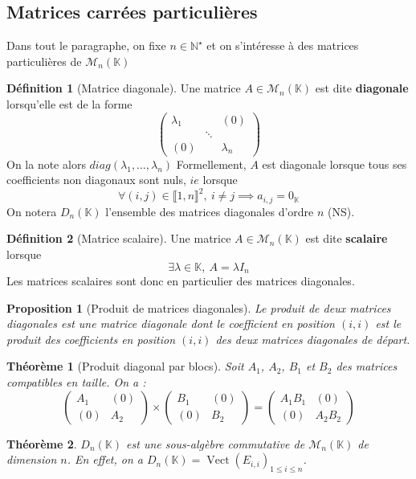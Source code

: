 \documentclass[french]{book}
\newcommand{\N}{\mathbb{N}}
\newcommand{\K}{\mathbb{K}}
\newcommand{\st}{^\star}
\theoremstyle{plain}
\newtheorem{thm}{Théorème}[chapter]
\newtheorem{prop}{Proposition}[chapter]
\theoremstyle{definition}
\newtheorem{dfn}{Définition}[chapter]
\theoremstyle{remark}
\DeclareMathOperator{\vect}{Vect}
\begin{document}
\subsection{Matrices carrées particulières}
Dans tout le paragraphe, on fixe $n\in\N\st$ et on s'intéresse à des matrices particulières de $\mathcal{M}_n(\K)$
\begin{dfn}[Matrice diagonale]
	Une matrice $A\in\mathcal{M}_n(\K)$ est dite \textbf{diagonale} lorsqu'elle est de la forme $$\begin{pmatrix}\lambda_1&&(0)\\&\ddots&\\ (0)&&\lambda_n\end{pmatrix}$$ On la note alors $diag(\lambda_1,\ldots,\lambda_n)$ Formellement, $A$ est diagonale lorsque tous ses coefficients non diagonaux sont nuls, $ie$ lorsque $$\forall(i,j)\in\llbracket1,n\rrbracket^2,\ i\ne j\implies a_{i,j}=0_\K$$ On notera $D_n(\K)$ l'ensemble des matrices diagonales d'ordre $n$ (NS).
\end{dfn}
\begin{dfn}[Matrice scalaire]
	Une matrice $A\in\mathcal{M}_n(\K)$ est dite \textbf{scalaire} lorsque $$\exists\lambda\in\K,\ A=\lambda I_n$$ Les matrices scalaires sont donc en particulier des matrices diagonales.
\end{dfn}
\begin{prop}[Produit de matrices diagonales]
	Le produit de deux matrices diagonales est une matrice diagonale dont le coefficient en position $(i,i)$ est le produit des coefficients en position $(i,i)$ des deux matrices diagonales de départ.
\end{prop}
\begin{thm}[Produit diagonal par blocs]
	Soit $A_1$, $A_2$, $B_1$ et $B_2$ des matrices compatibles en taille. On a : $$\begin{pmatrix}A_1&(0)\\ (0)&A_2\end{pmatrix}\times\begin{pmatrix}B_1&(0)\\ (0)&B_2\end{pmatrix}=\begin{pmatrix}A_1B_1&(0)\\ (0)&A_2B_2\end{pmatrix}$$
\end{thm}
\begin{thm}
	$D_n(\K)$ est une sous-algèbre commutative de $\mathcal{M}_n(\K)$ de dimension $n$. En effet, on a $D_n(\K)=\vect(E_{i,i})_{1\leqslant i\leqslant n}$.
\end{thm}
\end{document}
